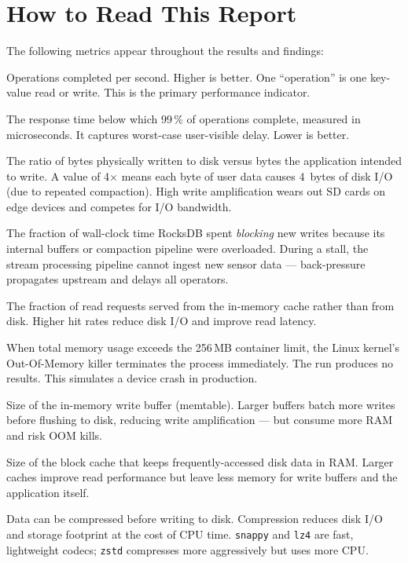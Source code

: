 \documentclass[10pt,a4paper]{scrartcl}
\begin{document}
\section{How to Read This Report}

The following metrics appear throughout the results and findings:

\begin{description}[style=nextline, nosep, leftmargin=1.2em, font=\bfseries]
  \item[ops/sec (throughput)]
    Operations completed per second. Higher is better. One ``operation'' is one
    key-value read or write. This is the primary performance indicator.
  \item[p99 latency ($\mu$s)]
    The response time below which 99\,\% of operations complete, measured in
    microseconds. It captures worst-case user-visible delay. Lower is better.
  \item[Write amplification (W.Amp)]
    The ratio of bytes physically written to disk versus bytes the application
    intended to write. A value of 4$\times$ means each byte of user data causes
    4~bytes of disk I/O (due to repeated compaction). High write amplification
    wears out SD cards on edge devices and competes for I/O bandwidth.
  \item[Stall\,\% (write stalls)]
    The fraction of wall-clock time RocksDB spent \emph{blocking} new writes
    because its internal buffers or compaction pipeline were overloaded. During a
    stall, the stream processing pipeline cannot ingest new sensor data ---
    back-pressure propagates upstream and delays all operators.
  \item[Block cache hit rate]
    The fraction of read requests served from the in-memory cache rather than
    from disk. Higher hit rates reduce disk I/O and improve read latency.
  \item[OOM kill]
    When total memory usage exceeds the 256\,MB container limit, the Linux
    kernel's Out-Of-Memory killer terminates the process immediately. The run
    produces no results. This simulates a device crash in production.
  \item[write\_buffer\_size]
    Size of the in-memory write buffer (memtable). Larger buffers batch more
    writes before flushing to disk, reducing write amplification --- but consume
    more RAM and risk OOM kills.
  \item[cache\_size]
    Size of the block cache that keeps frequently-accessed disk data in RAM.
    Larger caches improve read performance but leave less memory for write
    buffers and the application itself.
  \item[Compression (none / snappy / lz4 / zstd)]
    Data can be compressed before writing to disk. Compression reduces disk I/O
    and storage footprint at the cost of CPU time. \texttt{snappy} and
    \texttt{lz4} are fast, lightweight codecs; \texttt{zstd} compresses more
    aggressively but uses more CPU.
\end{description}
\end{document}
